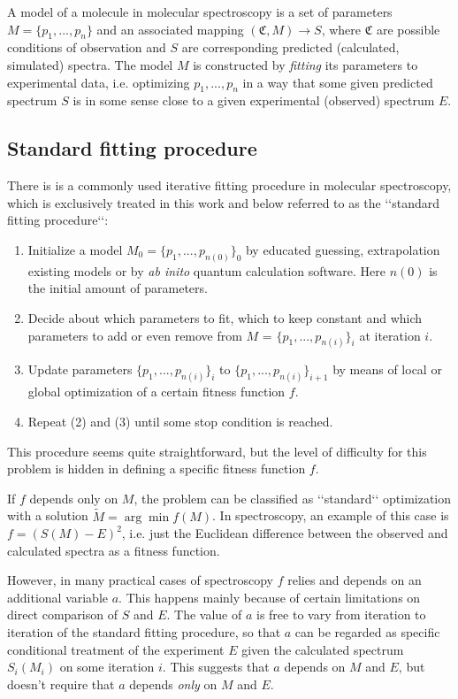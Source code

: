 \documentclass[11pt]{article}
\begin{document}
A model of a molecule in molecular spectroscopy is a set of parameters $M = \{p_1, ..., p_n\}$ and an associated mapping $(\mathfrak{C}, M) \rightarrow S$, where $\mathfrak{C}$ are possible conditions of observation and $S$ are corresponding predicted (calculated, simulated) spectra. The model $M$ is constructed by \emph{fitting} its parameters to experimental data, i.e. optimizing  $p_1, ..., p_n$ in a way that some given predicted spectrum $S$ is in some sense close to a given experimental (observed) spectrum $E$.  

\subsection{Standard fitting procedure}

There is is a commonly used iterative fitting procedure in molecular spectroscopy, which is exclusively treated in this work and below referred to as the \lq\lq{}standard fitting procedure\lq\lq{}: 

\begin{enumerate}
	\item Initialize a model $M_0 = \{{p_1}, ..., {p_{n(0)}}\}_0$ by educated guessing, extrapolation existing models or by \emph{ab inito} quantum calculation software. Here $n(0)$ is the initial amount of parameters. 
	\item Decide about which parameters to fit, which to keep constant and which parameters to add or even remove from $M$ = $\{{p_1}, ..., {p_{n(i)}}\}_i$ at iteration $i$.
	\item Update parameters $\{{p_1}, ..., {p_{n(i)}}\}_i$ to $\{{p_1}, ..., {p_{n(i)}}\}_{i + 1}$ by means of local or global optimization of a certain fitness function $f$. 
	\item Repeat (2) and (3) until some stop condition is reached.
	
\end{enumerate}

This procedure seems quite straightforward, but the level of difficulty for this problem is hidden in defining a specific fitness function $f$. 

If $f$ depends only on $M$, the problem can be classified as \lq\lq{}standard\lq\lq{} optimization with a solution $\tilde{M} = \arg\min f(M)$. In spectroscopy, an example of this case is $f = (S(M) - E)^2$, i.e. just the Euclidean difference between the observed and calculated spectra as a fitness function.

However, in many practical cases of spectroscopy $f$ relies and depends on an additional variable $a$. This happens mainly because of certain limitations on direct comparison of $S$ and $E$. The value of $a$ is free to vary from iteration to iteration of the standard fitting procedure, so that $a$ can be regarded as specific conditional treatment of the experiment $E$ given the calculated spectrum $S_i(M_i)$ on some iteration $i$. This suggests that $a$ depends on $M$ and $E$, but doesn't require that $a$ depends \emph{only} on $M$ and $E$. 
\end{document}
